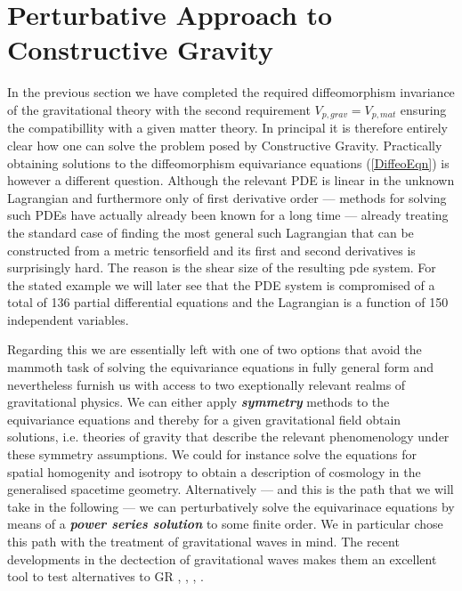 \documentclass[a4paper,12pt, DIV=14, BCOR=5mm, twoside, headsepline, numbers=noenddot]{scrbook}
\begin{document}
\section{Perturbative Approach to Constructive Gravity}
In the previous section we have completed the required diffeomorphism invariance of the gravitational theory with the second requirement $V_{p,grav}=V_{p,mat}$ ensuring the compatibillity with a given matter theory. In principal it is therefore entirely clear how one can solve the problem posed by Constructive Gravity. Practically obtaining solutions to the diffeomorphism equivariance equations (\ref{DiffeoEqn}) is however a different question. Although the relevant PDE is linear in the unknown Lagrangian and furthermore only of first derivative order --- methods for solving  such PDEs have actually already been known for a long time \cite{Han2015} --- already treating the standard case of finding the most general such Lagrangian that can be constructed from a metric tensorfield and its first and second derivatives is surprisingly hard. The reason is the shear size of the resulting pde system. For the stated example we will later see that the PDE system is compromised of a total of 136 partial differential equations and the Lagrangian is a function of 150 independent variables.  

Regarding this we are essentially left with one of two options that avoid the mammoth task of solving the equivariance equations in fully general form and nevertheless furnish us with access to two exeptionally relevant realms of gravitational physics. We can either apply \textbf{\textit{symmetry}} methods to the equivariance equations and thereby for a given gravitational field obtain solutions, i.e. theories of gravity that describe the relevant phenomenology under these symmetry assumptions. We could for instance solve the equations for spatial homogenity and isotropy to obtain a description of cosmology in the generalised spacetime geometry. Alternatively --- and this is the path that we will take in the following --- we can perturbatively solve the equivarinace equations by means of a \textit{\textbf{power series solution}} to some finite order. We in particular chose this path with the treatment of gravitational waves in mind.  The recent developments in the dectection of gravitational waves makes them an excellent tool to test alternatives to GR \cite{2010PhRvD..81f4008Y}, \cite{2011PhRvD..83j4022B}, \cite{2017PhRvD..95j4027Z}, \cite{2013LRR....16....9Y}. \\
\end{document}
